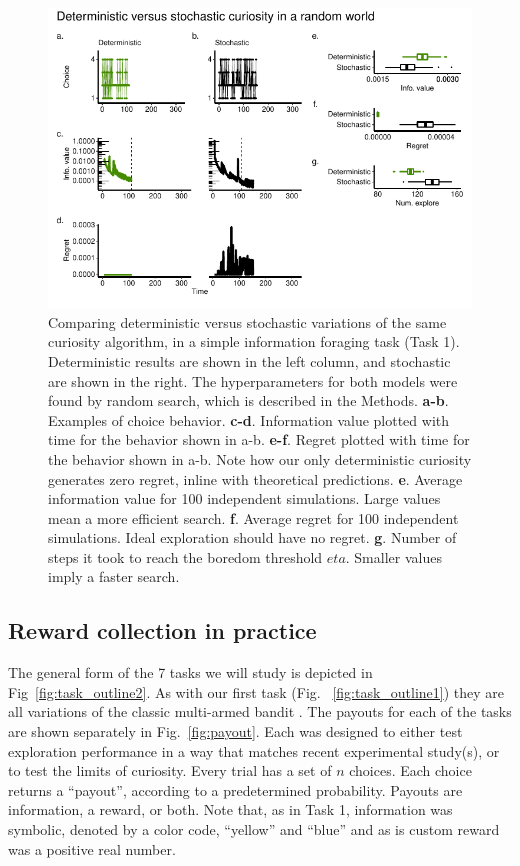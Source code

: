 \begin{figure}
	\begin{fullwidth}
	\includegraphics[width=.7\linewidth]{img/curiosity1.pdf} 
	\caption{Comparing deterministic versus stochastic variations of the same curiosity algorithm, in a simple information foraging task (Task 1). Deterministic results are shown in the left column, and stochastic are shown in the right. The hyperparameters for both models were found by random search, which is described in the Methods.
	\textbf{a-b}. Examples of choice behavior.
	\textbf{c-d}. Information value plotted with time for the behavior shown in a-b.
	\textbf{e-f}. Regret plotted with time for the behavior shown in a-b. Note how our only deterministic curiosity generates zero regret, inline with theoretical predictions.
	\textbf{e}. Average information value for 100 independent simulations. Large values mean a more efficient search.
	\textbf{f}. Average regret for 100 independent simulations. Ideal exploration should have no regret. 
	\textbf{g}. Number of steps it took to reach the boredom threshold $eta$. Smaller values imply a faster search.
	}
	\label{fig:curiosity1} 
	\end{fullwidth}
\end{figure}


\subsection{Reward collection in practice} The general form of the 7 tasks we will study is depicted in Fig~\ref{fig:task_outline2}. As with our first task (Fig. ~\ref{fig:task_outline1}) they are all variations of the classic multi-armed bandit \citep{Sutton2018}. The payouts for each of the tasks are shown separately in Fig.~\ref{fig:payout}. Each was designed to either test exploration performance in a way that matches recent experimental study(s), or to test the limits of curiosity. Every trial has a set of $n$ choices. Each choice returns a “payout”, according to a predetermined probability. Payouts are information, a reward, or both. Note that, as in Task 1, information was symbolic, denoted by a color code, “yellow” and “blue” and as is custom reward was a positive real number. 

